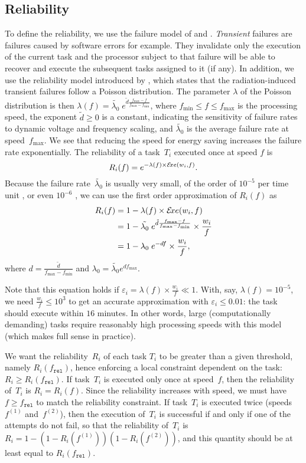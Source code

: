 \documentclass[a4paper]{article}
\theoremstyle{plain}
\theoremstyle{definition}
\theoremstyle{remark}
\newcommand{\fmax}{\ensuremath{f_{\max}}\xspace}
\newcommand{\fmin}{\ensuremath{f_{\min}}\xspace}
\newcommand{\fr}{\ensuremath{f_{\texttt{rel}}}\xspace}
\begin{document}
\subsection{Reliability}
    \label{sec.rel}
To define the reliability, we use the failure model of
\cite{Zhu04EEM} and \cite{Zhu06}. 
\emph{Transient} failures are failures caused by software errors for example. 
They invalidate only the execution of
the current task and the processor subject to that failure will be
able to recover and execute the subsequent tasks assigned to it (if
any). In addition, we use the reliability model introduced by \cite{Shatz89}, 
which states that the radiation-induced
transient failures follow a Poisson distribution.  The parameter
$\lambda$ of the Poisson distribution is then $\lambda(f)=\tilde{\lambda_0} \;  e^{\tilde{d}\frac{\fmax-f}{\fmax-\fmin}}$,
where $\fmin\leq f \leq \fmax$ is the processing speed, the exponent
$\tilde{d}\geq0$ is a constant, indicating the sensitivity of failure
rates to dynamic voltage and frequency scaling, and
$\tilde{\lambda_0}$ is the average failure rate at speed~\fmax.  We
see that reducing the speed for energy saving increases the failure
rate exponentially.  The reliability of a task~$T_i$ executed once at
speed $f$ is $$R_i(f)=e^{-\lambda(f)\times\mathcal{E}\!xe(w_i,f)}.$$  Because the
failure rate~$\tilde{\lambda_0}$ is usually very small, of the order of
$10^{-5}$ per time unit \cite{Assayad11}, or even $10^{-6}$
\cite{Baleani03,Izo07}, we can use the first order approximation of
$R_i(f)$ as \begin{align*}
R_i(f) &= 1-\lambda(f)\times\exe(w_i,f) \\
       &= 1-\tilde{\lambda_0}\;
       e^{\tilde{d}\frac{\fmax-f}{\fmax-\fmin}} \times \frac{w_i}{f}
       \\
       &= 1-\lambda_0\;e^{-df} \times \frac{w_i}{f},
       \end{align*}
where $d=\frac{\tilde{d}}{\fmax-\fmin}$ and $\lambda_0 =
\tilde{\lambda_0} e^{d\fmax}$. 

\medskip
Note that this equation holds if \mbox{$\varepsilon_{i} = \lambda(f) \times
  \frac{w_i}{f} \ll 1$}.  With, say, $\lambda(f) = 10^{-5}$, we need
$\frac{w_i}{f} \leq 10^{3}$ to get an accurate approximation with
$\varepsilon_{i} \leq 0.01$: the task should execute within $16$
minutes. In other words, large (computationally demanding) tasks
require reasonably high processing speeds with this model (which makes
full sense in practice).

We want the reliability~$R_i$ of each task $T_{i}$ to be greater than
a given threshold, namely $R_{i}(\fr)$, hence enforcing a local
constraint dependent on the task: $R_i \geq R_{i}(\fr)$.   
If task~$T_{i}$ is executed only once at speed~$f$, then the
reliability of~$T_i$ is $R_i=R_i(f)$. Since the reliability increases
with speed, we must have $f\geq \fr$ to match the reliability
constraint.
If task~$T_{i}$ is executed twice (speeds~$f^{(1)}$ and~$f^{(2)}$),
then the execution of~$T_{i}$ is successful if and only if one of the
attempts do not fail, so that the reliability of~$T_{i}$ is $R_{i}= 1
- (1 - R_i(f^{(1)}))( 1 - R_i(f^{(2)}))$, and this quantity should be
at least equal to $R_{i}(\fr)$. 
\end{document}
